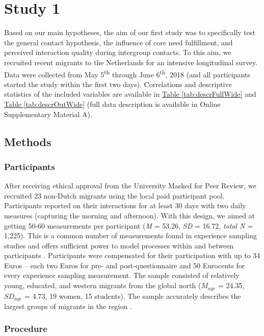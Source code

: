 \documentclass[man, 12pt, a4paper, mask]{apa7}
\theoremstyle{break}
\theoremstyle{plain}
\newcommand{\tblref}[2][]{\hyperref[#2]{Table \ref*{#2}#1}}
\begin{document}
\section{Study 1}

Based on our main hypotheses, the aim of our first study was to
specifically test the general contact hypothesis, the influence of core
need fulfillment, and perceived interaction quality during intergroup
contacts. To this aim, we recruited recent migrants to the Netherlands
for an intensive longitudinal survey. Data were collected from May
5\textsuperscript{th} through June 6\textsuperscript{th}, 2018 (and all
participants started the study within the first two days). Correlations
and descriptive statistics of the included variables are available in
\tblref{tab:descrFullWide} and \tblref{tab:descrOutWide} (full data
description is available in Online Supplementary Material A).

\subsection{Methods}

\subsubsection{Participants}

After receiving ethical approval from the University Masked for Peer
Review, we recruited 23 non-Dutch migrants using the local paid
participant pool. Participants reported on their interactions for at
least 30 days with two daily measures (capturing the morning and
afternoon). With this design, we aimed at getting 50-60 measurements per
participant (\textit{M} = 53.26, \textit{SD} = 16.72, \textit{total N} =
1,225). This is a common number of measurements found in experience
sampling studies and offers sufficient power to model processes within
and between participants \citep[e.g.,][]{AanhetRot2012}. Participants
were compensated for their participation with up to 34 Euros -- each two
Euros for pre- and post-questionnaire and 50 Eurocents for every
experience sampling measurement. The sample consisted of relatively
young, educated, and western migrants from the global north (\(M_{age}\)
= 24.35, \(SD_{age}\) = 4.73, 19 women, 15 students). The sample
accurately describes the largest groups of migrants in the region
\citep[][]{GemeenteGroningen2015}.

\subsubsection{Procedure}
\end{document}
